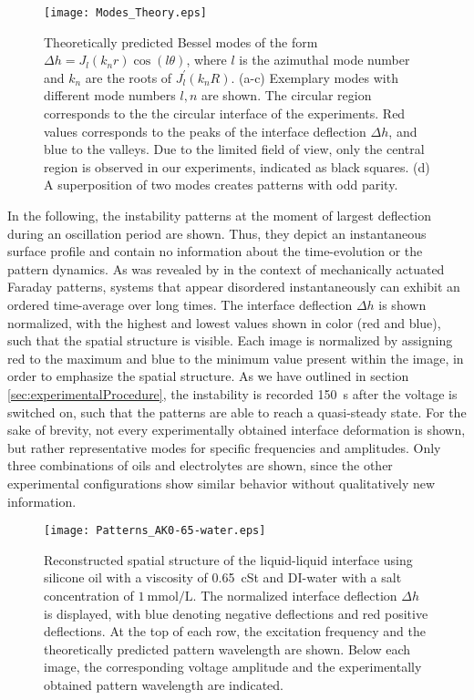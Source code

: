 \documentclass{jfm_arxiv}
\begin{document}
\begin{figure}
  \centerline{\texttt{[image: Modes\_Theory.eps]}}%
  \caption{Theoretically predicted Bessel modes of the form $\Delta h = J_l\left( k_n r \right) \cos \left( l \theta \right)$, where $l$ is the azimuthal mode number and $k_n$ are the roots of $J_l^\prime\left( k_n R \right)$. (a-c) Exemplary modes with different mode numbers $l, n$ are shown. The circular region corresponds to the the circular interface of the experiments. Red values corresponds to the peaks of the interface deflection $\Delta h$, and blue to the valleys. Due to the limited field of view, only the central region is observed in our experiments, indicated as black squares. (d) A superposition of two modes creates patterns with odd parity.}
\label{fig:Results_Modes_Theory}
\end{figure}

In the following, the instability patterns at the moment of largest deflection during an oscillation period are shown. Thus, they depict an instantaneous surface profile and contain no information about the time-evolution or the pattern dynamics. As was revealed by \citet{Gluckman1993} in the context of mechanically actuated Faraday patterns, systems that appear disordered instantaneously can exhibit an ordered time-average over long times.
The interface deflection $\Delta h$ is shown normalized, with the highest and lowest values shown in color (red and blue), such that the spatial structure is visible.
Each image is normalized by assigning red to the maximum and blue to the minimum value present within the image, in order to emphasize the spatial structure.
As we have outlined in section \ref{sec:experimentalProcedure}, the instability is recorded \SI{150}{\second} after the voltage is switched on, such that the patterns are able to reach a quasi-steady state.
For the sake of brevity, not every experimentally obtained interface deformation is shown, but rather representative modes for specific frequencies and amplitudes. Only three combinations of oils and electrolytes are shown, since the other experimental configurations show similar behavior without qualitatively new information.

\begin{figure}
  \centerline{\texttt{[image: Patterns\_AK0-65-water.eps]}}%
  \caption{Reconstructed spatial structure of the liquid-liquid interface using silicone oil with a viscosity of \SI{0.65}{\centi St} and DI-water with a salt concentration of $\SI{1}{\milli\mol\per\liter}$. The normalized interface deflection $\Delta h$ is displayed, with blue denoting negative deflections and red positive deflections. At the top of each row, the excitation frequency and the theoretically predicted pattern wavelength are shown. Below each image, the corresponding voltage amplitude and the experimentally obtained pattern wavelength are indicated.}
\label{fig:Results_Modes_0-65cSt_water}
\end{figure}
\end{document}
